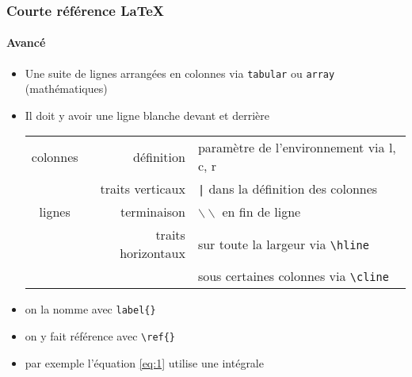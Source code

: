 \begin{frame}[fragile]
  \frametitle{Courte référence \LaTeX{}}
  \framesubtitle{Avancé}


  \begin{itemize}
  \item Une suite de lignes arrangées en colonnes via \verb|tabular| ou \verb|array| (mathématiques)
  \item Il doit y avoir une ligne blanche devant et derrière
    
    \begin{tabular}{|c|r|l|}
      \firsthline
      colonnes & définition         & paramètre de l'environnement via l, c, r  \\ \cline{2-3}
               & traits verticaux   & \verb!|! dans la définition des colonnes  \\ \hline
      lignes   & terminaison        & $\backslash\backslash$ en fin de ligne    \\ \cline{2-3}
               & traits horizontaux & sur toute la largeur via \verb|\hline|    \\ \cline{2-3}
               &                    & sous certaines colonnes via \verb|\cline| \\ \hline
    \end{tabular}
  \end{itemize}


  \begin{itemize}
  \item on la nomme avec \verb|label{}|
  \item on y fait référence avec \verb|\ref{}|
  \item par exemple l'équation \ref{eq:1} utilise une intégrale
  \end{itemize}
\end{frame}


